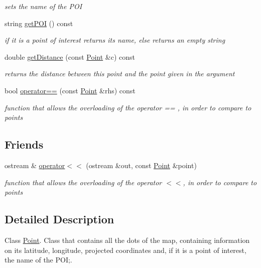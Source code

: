 \begin{DoxyCompactItemize}
\begin{DoxyCompactList}\small\item\em sets the name of the P\+OI \end{DoxyCompactList}\item 
string \hyperlink{class_point_ae3f1aa6c4314c2c6d628f84da7538547}{get\+P\+OI} () const 
\begin{DoxyCompactList}\small\item\em if it is a point of interest returns its name, else returns an empty string \end{DoxyCompactList}\item 
double \hyperlink{class_point_a71c24131d9fba05674a1295102b0c7a3}{get\+Distance} (const \hyperlink{class_point}{Point} \&c) const 
\begin{DoxyCompactList}\small\item\em returns the distance between this point and the point given in the argument \end{DoxyCompactList}\item 
bool \hyperlink{class_point_a381c5b2ac13d8a3966f5225f94fff6fa}{operator==} (const \hyperlink{class_point}{Point} \&rhs) const 
\begin{DoxyCompactList}\small\item\em function that allows the overloading of the operator == , in order to compare to points \end{DoxyCompactList}\end{DoxyCompactItemize}
\subsection*{Friends}
\begin{DoxyCompactItemize}
\item 
ostream \& \hyperlink{class_point_ab70fc46f0389b8eb1b377d966d144e05}{operator$<$$<$} (ostream \&out, const \hyperlink{class_point}{Point} \&point)
\begin{DoxyCompactList}\small\item\em function that allows the overloading of the operator $<$$<$, in order to compare to points \end{DoxyCompactList}\end{DoxyCompactItemize}


\subsection{Detailed Description}
Class \hyperlink{class_point}{Point}. Class that contains all the dots of the map, containing information on its latitude, longitude, projected coordinates and, if it is a point of interest, the name of the P\+OI;. 

